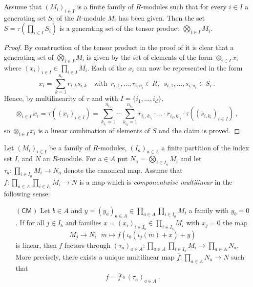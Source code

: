 \begin{lemma}\label{thm:image-generating-system-canoncial-map-finite-tensor-product-generating-system} 
  Assume that $(M_i)_{i\in I}$ is a finite family of $R$-modules such that for every $i\in I$ a
  generating set $S_i$ of the $R$-module $M_i$ has been given. Then the set
  $S = \tau \left( \prod_{i\in I}S_i \right)$ is a generating set of the tensor product
  $\bigotimes_{i\in I} M_i$. 
\end{lemma}

\begin{proof}
  By construction of the tensor product in the proof of
   it is clear that
  a generating set of $\bigotimes_{i\in I} M_i$ is given by the set
  of elements of the form $\otimes_{i\in I}x_i$ where $(x_i)_{i\in I}\in \prod_{i\in I}M_i$.
  Each of the $x_i$ can now be represented in the form
  \[
    x_i = \sum_{k=1}^{n_i} r_{i,k} s_{i,k} \quad\text{with}\enspace r_{i,1},\ldots ,r_{i,n_i}\in R,\enspace
    s_{i,1},\ldots ,s_{i,n_i}\in S_i \ .
  \]
  Hence, by multilinearity of $\tau$ and with $I=\{ i_1,\ldots ,i_d\}$,
  \[
    \otimes_{i\in I}x_i = \tau \left( (x_i)_{i\in I} \right) =
    \sum_{k_{i_1} =1}^{n_{i_1}}\cdots  \sum_{k_{i_d} =1}^{n_{i_d}} r_{i_1,k_{i_1}} \cdot \ldots \cdot r_{i_d,k_{i_d}}
    \cdot \tau \left( (s_{i,k_i})_{i\in I} \right)  \ ,
  \] 
  so $\otimes_{i\in I}x_i$ is a linear combination of elements of $S$ and the claim is proved. 
\end{proof}

\begin{lemma}\label{thm:componentwise-multilinear-maps-factorization}
  Let $(M_i)_{i\in I}$ be a family of $R$-modules, $(I_a)_{a\in A}$ a finite partition
  of the index set $I$, and $N$ an $R$-module. For $a\in A$ put
  $N_a = \bigotimes_{i\in I_a} M_i$ and let $\tau_a:  \prod_{i\in I_a} M_i \to  N_a$
  denote the canonical map. Assume that
  $f : \prod_{a\in A}\prod_{i\in I_a} M_i \to N$ is a map which is
  \emph{componentwise multilinear} in the following sense. 
  \begin{itemize}
  \item[$(\mathsf{ CM})$\hspace{-1mm}]
    Let $b\in A$ and $y=(y_a)_{a\in A}   \in \prod_{a\in A}\prod_{i\in I_a} M_i $
    a family with $y_b =0$. If for all $j\in I_b$ and families
    $x=(x_i)_{i\in I_b}\in \prod_{i\in I_b} M_i$ with $x_j  =0$ the  map
    \[
       M_j \to N , \enspace m \mapsto f( \iota_b (\iota_j (m) + x) + y)
    \]
    is linear, then $f$ factors through
    $(\tau_a)_{a\in A}: \prod_{a\in A}\prod_{i\in I_a} M_i \to
    \prod_{a\in A}N_a $. More precisely, there exists
    a unique multilinear map $\overline{f} : \prod_{a\in A}N_a \to N$ such that
    \[
       f = \overline{f} \circ (\tau_a)_{a\in A} \ .
    \]
  \end{itemize}
\end{lemma}

